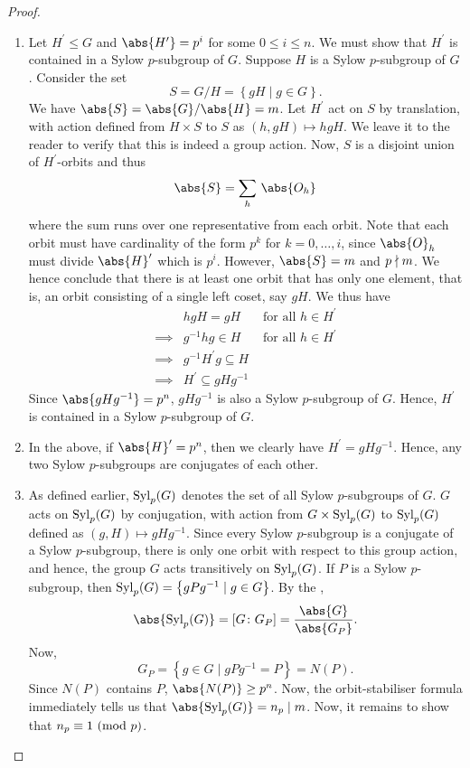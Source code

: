 \begin{proof}
\begin{enumerate}
        \item Let $H^{\prime} \leq G$ and $\abs{H^{\prime}} = p^i$ for some $0 \leq i \leq n$. We must show that $H^{\prime}$ is contained in a Sylow $p$-subgroup of $G$. Suppose $H$ is a Sylow $p$-subgroup of $G$. Consider the set
        \[
            S = G/H = \left\{ gH \mid g \in G \right\}.
        \]
        We have $\abs{S} = \abs{G}/\abs{H} = m$. Let $H^{\prime}$ act on $S$ by translation, with action defined from $H \times S$ to $S$ as $(h, gH) \mapsto hgH$. We leave it to the reader to verify that this is indeed a group action. Now, $S$ is a disjoint union of $H^{\prime}$-orbits and thus 
        \[
            \abs{S} = \sum_{h} \, \abs{O_h}
        \]
        where the sum runs over one representative from each orbit. Note that each orbit must have cardinality of the form $p^k$ for $k=0, \ldots,i$, since $\abs{O}_h$ must divide $\abs{H}^{\prime}$ which is $p^i$. However, $\abs{S} = m$ and $p \nmid m$. We hence conclude that there is at least one orbit that has only one element, that is, an orbit consisting of a single left coset, say $gH$. We thus have
        \begin{align*}
            &hgH = gH &\text{ for all } h \in H^{\prime} \\
            \implies &g^{-1}hg \in H &\text{ for all } h \in H^{\prime} \\
            \implies &g^{-1}H^{\prime}g \subseteq H \\
            \implies &H^{\prime} \subseteq gHg^{-1}
        \end{align*}
        Since $\abs{gHg^{-1}} = p^n$, $gHg^{-1}$ is also a Sylow $p$-subgroup of $G$. Hence, $H^{\prime}$ is contained in a Sylow $p$-subgroup of $G$.
        
        \item In the above, if $\abs{H}^{\prime} = p^n$, then we clearly have $H^{\prime} = gHg^{-1}$. Hence, any two Sylow $p$-subgroups are conjugates of each other.
        
        \item As defined earlier, $\operatorname{Syl}_p(G)$ denotes the set of all Sylow $p$-subgroups of $G$. $G$ acts on $\operatorname{Syl}_p(G)$ by conjugation, with action from $G \times \operatorname{Syl}_p(G)$ to $\operatorname{Syl}_p(G)$ defined as $(g,H) \mapsto gHg^{-1}$. Since every Sylow $p$-subgroup is a conjugate of a Sylow $p$-subgroup, there is only one orbit with respect to this group action, and hence, the group $G$ acts transitively on $\operatorname{Syl}_p(G)$. If $P$ is a Sylow $p$-subgroup, then $\operatorname{Syl}_p(G) = \left\{ gPg^{-1} \mid g \in G \right\}$. By the , 
        \[
            \abs{\Syl_p(G)} = \left[ G \colon G_P \right] = \frac{\abs{G}}{\abs{G_P}}.
        \]
        Now, 
        \[
            G_P = \left\{ g \in G \mid gPg^{-1} = P \right\} = N(P).
        \]
        Since $N(P)$ contains $P$, $\abs{N(P)} \geq p^n$. Now, the orbit-stabiliser formula immediately tells us that $\abs{\Syl_p(G)} = n_p \divides m$. Now, it remains to show that $n_p \equiv 1 \ (\mathrm{mod}\ p)$.
        

\end{enumerate}
\end{proof}

